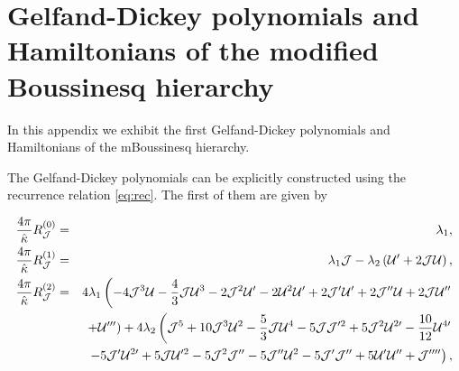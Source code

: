 \documentclass[letterpaper,11pt,oneside]{book}
\begin{document}
\chapter{Gelfand-Dickey polynomials and Hamiltonians of the modified Boussinesq
	hierarchy\label{Appendix 4: Gelfand-Dikckey pol mBsq}}

In this appendix we exhibit the first Gelfand-Dickey polynomials and
Hamiltonians of the mBoussinesq hierarchy.

The Gelfand-Dickey polynomials can be explicitly constructed using
the recurrence relation \eqref{eq:rec}. The first of them are given
by

\begin{eqnarray*}
	\frac{4\pi}{\hat{\kappa}}R_{\mathcal{J}}^{\left(0\right)} & = & \lambda_{1},\\
	\frac{4\pi}{\hat{\kappa}}R_{\mathcal{J}}^{\left(1\right)} & = & \lambda_{1}\mathcal{J}-\lambda_{2}\left(\mathcal{U}^{\prime}+2\mathcal{J}\mathcal{U}\right),\\
	\frac{4\pi}{\hat{\kappa}}R_{\mathcal{J}}^{\left(2\right)} & = & 4\lambda_{1}\left(-4\mathcal{J}^{3}\mathcal{U}-\frac{4}{3}\mathcal{J}\mathcal{U}^{3}-2\mathcal{J}^{2}\mathcal{U}^{\prime}-2\mathcal{U}^{2}\mathcal{U}^{\prime}+2\mathcal{J}^{\prime}\mathcal{U}^{\prime}+2\mathcal{J}^{\prime\prime}\mathcal{U}+2\mathcal{J}\mathcal{U}^{\prime\prime}\right.\\
	{\color{red}} & {\color{red}} & \left.+\mathcal{U}^{\prime\prime\prime}\right)+4\lambda_{2}\left(\mathcal{J}^{5}+10\mathcal{J}^{3}\mathcal{U}^{2}-\frac{5}{3}\mathcal{J}\mathcal{U}^{4}-5\mathcal{J}\mathcal{J}^{\prime2}+5\mathcal{J}^{2}\mathcal{U}^{2\prime}-\frac{10}{12}\mathcal{U}^{4\prime}\right.\\
	&  & \left.-5\mathcal{J}^{\prime}\mathcal{U}^{2\prime}+5\mathcal{J}\mathcal{U}^{\prime2}-5\mathcal{J}^{2}\mathcal{J}^{\prime\prime}-5\mathcal{J}^{\prime\prime}\mathcal{U}^{2}-5\mathcal{J}^{\prime}\mathcal{J}^{\prime\prime}+5\mathcal{U}^{\prime}\mathcal{U}^{\prime\prime}+\mathcal{J}^{\prime\prime\prime\prime}\right),
\end{eqnarray*}
\end{document}
